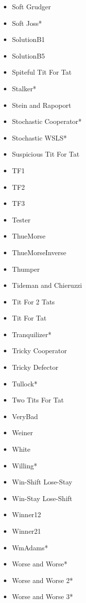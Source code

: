 \begin{appendices}
\begin{multicols}{4}
\begin{itemize}
            \item Soft Grudger
            \item Soft Joss*
            \item SolutionB1
            \item SolutionB5
            \item Spiteful Tit For Tat
            \item Stalker*
            \item Stein and Rapoport
            \item Stochastic Cooperator*
            \item Stochastic WSLS*
            \item Suspicious Tit For Tat
            \item TF1
            \item TF2
            \item TF3
            \item Tester
            \item ThueMorse
            \item ThueMorseInverse
            \item Thumper
            \item Tideman and Chieruzzi
            \item Tit For 2 Tats
            \item Tit For Tat
            \item Tranquilizer*
            \item Tricky Cooperator
            \item Tricky Defector
            \item Tullock*
            \item Two Tits For Tat
            \item VeryBad
            \item Weiner
            \item White
            \item Willing*
            \item Win-Shift Lose-Stay
            \item Win-Stay Lose-Shift
            \item Winner12
            \item Winner21
            \item WmAdams*
            \item Worse and Worse*
            \item Worse and Worse 2*
            \item Worse and Worse 3*

\end{itemize}
\end{multicols}
\end{appendices}
